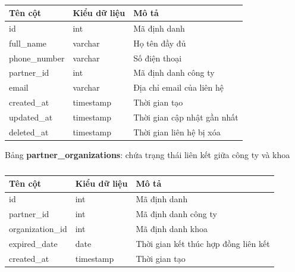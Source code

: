 \documentclass[./../main.tex]{subfiles}
\begin{document}
\begin{table}[H]
	\caption{}
	\label{tab:db_partner_contacts}
	\begin{tabular}{|l|l|l|}
	\hline
	\textbf{Tên cột} & \textbf{Kiểu dữ liệu} & \textbf{Mô tả}              \\ \hline
	id               & int                   & Mã định danh                \\ \hline
	full\_name       & varchar               & Họ tên đầy đủ               \\ \hline
	phone\_number    & varchar               & Số điện thoại               \\ \hline
	partner\_id      & int                   & Mã định danh công ty        \\ \hline
	email            & varchar               & Địa chỉ email của liên hệ   \\ \hline
	created\_at      & timestamp             & Thời gian tạo               \\ \hline
	updated\_at      & timestamp             & Thời gian cập nhật gần nhất \\ \hline
	deleted\_at      & timestamp             & Thời gian liên hệ bị xóa    \\ \hline
	\end{tabular}
\end{table}

Bảng \textbf{partner\_organizations}: chứa trạng thái liên kết giữa công ty và khoa

\begin{table}[H]
	\caption{}
	\label{tab:db_partner_orgs}
	\begin{tabular}{|l|l|l|}
	\hline
	\textbf{Tên cột} & \textbf{Kiểu dữ liệu} & \textbf{Mô tả}                       \\ \hline
	id               & int                   & Mã định danh                         \\ \hline
	partner\_id      & int                   & Mã định danh công ty                 \\ \hline
	organization\_id & int                   & Mã định danh khoa                    \\ \hline
	expired\_date    & date                  & Thời gian kết thúc hợp đồng liên kết \\ \hline
	created\_at      & timestamp             & Thời gian tạo                        \\ \hline
	\end{tabular}
\end{table}
\end{document}
